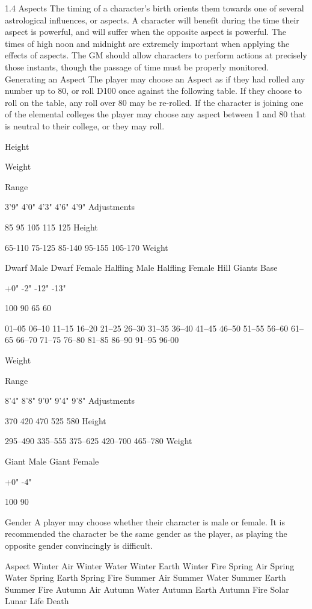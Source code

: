 \documentclass[a4paper]{article}
\begin{document}
\begin{multicols}{3}
1.4 Aspects
The timing of a character’s birth orients them
towards one of several astrological influences, or
aspects. A character will benefit during the time
their aspect is powerful, and will suffer when the
opposite aspect is powerful.
The times of high noon and midnight are extremely
important when applying the effects of aspects.
The GM should allow characters to perform actions at precisely those instants, though the passage
of time must be properly monitored.
Generating an Aspect
The player may choose an Aspect as if they had
rolled any number up to 80, or roll D100 once
against the following table. If they choose to roll
on the table, any roll over 80 may be re-rolled.
If the character is joining one of the elemental
colleges the player may choose any aspect between
1 and 80 that is neutral to their college, or they may
roll.

Height

Weight

Range

3’9"
4’0"
4’3"
4’6"
4’9"
Adjustments

85
95
105
115
125
Height

65-110
75-125
85-140
95-155
105-170
Weight

Dwarf Male
Dwarf Female
Halﬂing Male
Halﬂing Female
Hill Giants Base

+0"
-2"
-12"
-13"

100%
90%
65%
60%

01–05
06–10
11–15
16–20
21–25
26–30
31–35
36–40
41–45
46–50
51–55
56–60
61–65
66–70
71–75
76–80
81–85
86–90
91–95
96-00

Weight

Range

8’4"
8’8"
9’0"
9’4"
9’8"
Adjustments

370
420
470
525
580
Height

295–490
335–555
375–625
420–700
465–780
Weight

Giant Male
Giant Female

+0"
-4"

100%
90%

Gender
A player may choose whether their character is
male or female. It is recommended the character be
the same gender as the player, as playing the opposite gender convincingly is difficult.

Aspect
Winter Air
Winter Water
Winter Earth
Winter Fire
Spring Air
Spring Water
Spring Earth
Spring Fire
Summer Air
Summer Water
Summer Earth
Summer Fire
Autumn Air
Autumn Water
Autumn Earth
Autumn Fire
Solar
Lunar
Life
Death


\end{multicols}
\end{document}
